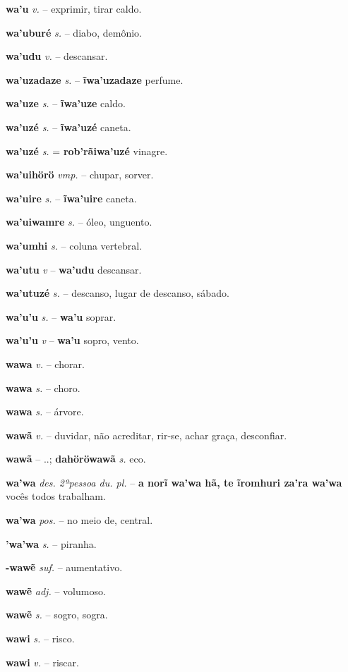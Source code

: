 \textbf{wa'u} \textit{v.} -- exprimir, tirar caldo.

\textbf{wa'uburé} \textit{s.} -- diabo, demônio.

\textbf{wa'udu} \textit{v.} -- descansar.

\textbf{wa'uzadaze} \textit{s.} -- \textbf{ĩwa'uzadaze} perfume.

\textbf{wa'uze} \textit{s.} -- \textbf{ĩwa'uze} caldo.

\textbf{wa'uzé} \textit{s.} -- \textbf{ĩwa'uzé} caneta.

\textbf{wa'uzé} \textit{s.} = \textbf{rob'rãiwa'uzé} vinagre.

\textbf{wa'uihörö} \textit{vmp.} -- chupar, sorver.

\textbf{wa'uire} \textit{s.} -- \textbf{ĩwa'uire} caneta.

\textbf{wa'uiwamre} \textit{s.} -- óleo, unguento.

\textbf{wa'umhi} \textit{s.} -- coluna vertebral.

\textbf{wa'utu} \textit{v} -- \textbf{wa'udu} descansar.

\textbf{wa'utuzé} \textit{s.} -- descanso, lugar de descanso, sábado.

\textbf{wa'u'u} \textit{s.} -- \textbf{wa'u} soprar.

\textbf{wa'u'u} \textit{v} -- \textbf{wa'u} sopro, vento.

\textbf{wawa} \textit{v.} -- chorar.

\textbf{wawa} \textit{s.} -- choro.

\textbf{wawa} \textit{s.} -- árvore.

\textbf{wawã} \textit{v.} -- duvidar, não acreditar, rir-se, achar graça, desconfiar.

\textbf{wawã} \textit{} -- ..; \textbf{dahöröwawã} \textit{s.} eco.

\textbf{wa'wa} \textit{des. 2ªpessoa du. pl.} -- \textbf{a norĩ wa'wa hã, te ĩromhuri za'ra wa'wa} vocês todos trabalham.

\textbf{wa'wa} \textit{pos.} -- no meio de, central.

\textbf{'wa'wa} \textit{s.} -- piranha.

\textbf{-wawẽ} \textit{suf.} -- aumentativo.

\textbf{wawẽ} \textit{adj.} -- volumoso.

\textbf{wawẽ} \textit{s.} -- sogro, sogra.

\textbf{wawi} \textit{s.} -- risco.

\textbf{wawi} \textit{v.} -- riscar.

